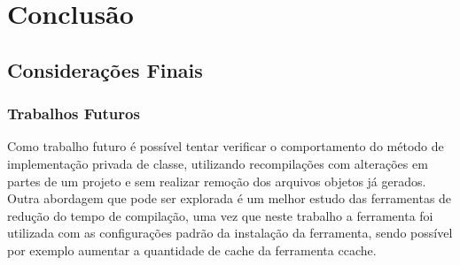 \part{Conclusão}

\chapter[Considerações Finais]{Considerações Finais}

\section{Trabalhos Futuros}
	Como trabalho futuro é possível tentar verificar o comportamento do método de implementação
 privada de classe, utilizando recompilações com alterações em partes de um projeto e sem
 realizar remoção dos arquivos objetos já gerados.
	Outra abordagem que pode ser explorada é um melhor estudo das ferramentas de redução do
 tempo de compilação, uma vez que neste trabalho a ferramenta foi utilizada com as configurações
 padrão da instalação da ferramenta, sendo possível por exemplo aumentar a quantidade de cache
 da ferramenta ccache.

